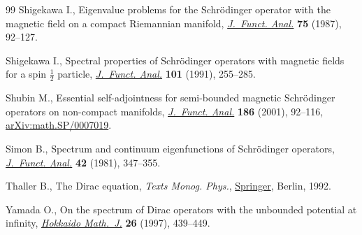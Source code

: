 \documentclass[10pt,a4paper]{amsart}
\numberwithin{equation}{section}
\begin{document}
\begin{thebibliography}{99}
Shigekawa I., Eigenvalue problems for the {S}chr\"odinger operator with the
 magnetic field on a compact {R}iemannian manifold, \href{https://doi.org/10.1016/0022-1236(87)90108-X}{\textit{J.~Funct. Anal.}}
 \textbf{75} (1987), 92--127.

Shigekawa I., Spectral properties of {S}chr\"odinger operators with magnetic
 fields for a spin {$\frac12$} particle, \href{https://doi.org/10.1016/0022-1236(91)90158-2}{\textit{J.~Funct. Anal.}} \textbf{101}
 (1991), 255--285.

Shubin M., Essential self-adjointness for semi-bounded magnetic {S}chr\"odinger
 operators on non-compact manifolds, \href{https://doi.org/10.1006/jfan.2001.3778}{\textit{J.~Funct. Anal.}} \textbf{186}
 (2001), 92--116, \href{https://arxiv.org/abs/math.SP/0007019}{arXiv:math.SP/0007019}.

Simon B., Spectrum and continuum eigenfunctions of {S}chr\"odinger operators,
 \href{https://doi.org/10.1016/0022-1236(81)90094-X}{\textit{J.~Funct. Anal.}} \textbf{42} (1981), 347--355.

Thaller B., The {D}irac equation, \textit{Texts Monog. Phys.}, \href{https://doi.org/10.1007/978-3-662-02753-0}{Springer}, Berlin, 1992.

Yamada O., On the spectrum of {D}irac operators with the unbounded potential at
 infinity, \href{https://doi.org/10.14492/hokmj/1351257976}{\textit{Hokkaido Math.~J.}} \textbf{26} (1997), 439--449.

\end{thebibliography}
\end{document}
